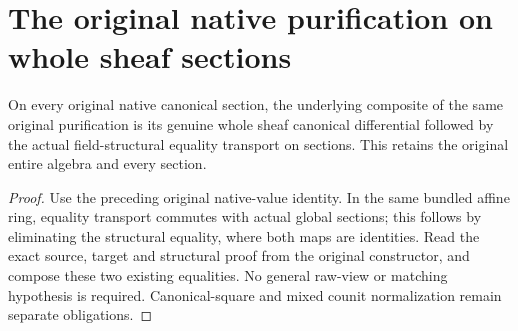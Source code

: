 \section{The original native purification on whole sheaf sections}

\begin{lemma}
\label{lem:kn-mixed-original-native-readback}
\leanok
On every original native canonical section, the underlying composite of
the same original purification is its genuine whole sheaf canonical
differential followed by the actual field-structural equality transport
on sections. This retains the original entire algebra and every section.
\end{lemma}
\begin{proof}
Use the preceding original native-value identity. In the same bundled
affine ring, equality transport commutes with actual global sections;
this follows by eliminating the structural equality, where both maps
are identities. Read the exact source, target and structural proof from
the original constructor, and compose these two existing equalities.
No general raw-view or matching hypothesis is required. Canonical-square
and mixed counit normalization remain separate obligations.
\end{proof}
